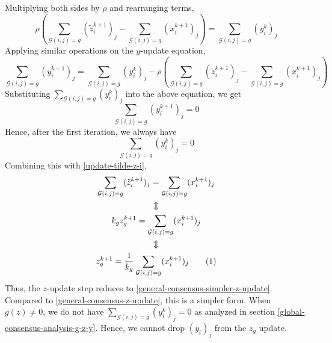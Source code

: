 \documentclass{article}
\theoremstyle{remark}
\newcommand\numberthis{\addtocounter{equation}{1}\tag{\theequation}}
\begin{document}
Multiplying both sides by $\rho$ and rearranging terms,
\[
\rho\left(\sum_{\mathcal{G}(i,j)=g}(\tilde{z}_i^{k+1})_j-\sum_{\mathcal{G}(i,j)=g}(x_i^{k+1})_j\right)=\sum_{\mathcal{G}(i,j)=g}(y_i^k)_j
\]
Applying similar operations on the $y$-update equation,
\[
\sum_{\mathcal{G}(i,j)=g}(y_i^{k+1})_j=\sum_{\mathcal{G}(i,j)=g}(y_i^k)_j-\rho\left(\sum_{\mathcal{G}(i,j)=g}(\tilde{z}_i^{k+1})_j-\sum_{\mathcal{G}(i,j)=g}(x_i^{k+1})_j\right)
\]
Substituting $\sum_{\mathcal{G}(i,j)=g}(y_i^k)_j$ into the above equation, we get
\[
\sum_{\mathcal{G}(i,j)=g}(y_i^{k+1})_j=0
\]
Hence, after the first iteration, we always have
\[
\sum_{\mathcal{G}(i,j)=g}(y_i^{k})_j=0
\]
Combining this with \eqref{update-tilde-z-i},
\begin{gather*}%
  \sum_{\mathcal{G}(i,j)=g}(\tilde{z}_i^{k+1})_j=\sum_{\mathcal{G}(i,j)=g}(x_i^{k+1})_j \\
  \Updownarrow\\
  k_gz_g^{k+1}=\sum_{\mathcal{G}(i,j)=g}(x_i^{k+1})_j \\
  \Updownarrow\\
  z_g^{k+1}=\frac{1}{k_g}\sum_{\mathcal{G}(i,j)=g}(x_i^{k+1})_j \numberthis \label{general-consensus-simpler-z-update}
\end{gather*}
Thus, the $z$-update step reduces to \eqref{general-consensus-simpler-z-update}. Compared to \eqref{general-consensus-z-update}, this is a simpler form. When $g(z)\neq0$, we do not have $\sum_{\mathcal{G}(i,j)=g}(y_i^{k})_j=0$ as analyzed in section \ref{global-consensus-analysis-g-z-y}. Hence, we cannot drop $(y_i)_j$ from the $z_g$ update.
\end{document}
